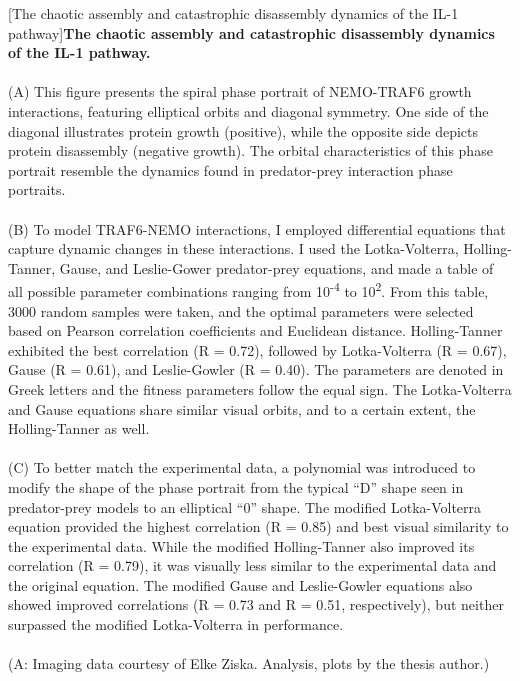 \begin{centering}
\captionsetup{parbox=none}
[The chaotic assembly and catastrophic disassembly dynamics of the IL-1 pathway]{\textbf{The chaotic assembly and catastrophic disassembly dynamics of the IL-1 pathway.}
\\
\\
(A) This figure presents the spiral phase portrait of NEMO-TRAF6 growth interactions, featuring elliptical orbits and diagonal symmetry. One side of the diagonal illustrates protein growth (positive), while the opposite side depicts protein disassembly (negative growth). The orbital characteristics of this phase portrait resemble the dynamics found in predator-prey interaction phase portraits.
\\
\\
(B) To model TRAF6-NEMO interactions, I employed differential equations that capture dynamic changes in these interactions. I used the Lotka-Volterra, Holling-Tanner, Gause, and Leslie-Gower predator-prey equations, and made a table of all possible parameter combinations ranging from 10\textsuperscript{-4} to 10\textsuperscript{2}. From this table, 3000 random samples were taken, and the optimal parameters were selected based on Pearson correlation coefficients and Euclidean distance. Holling-Tanner exhibited the best correlation (R = 0.72), followed by Lotka-Volterra (R = 0.67), Gause (R = 0.61), and Leslie-Gowler (R = 0.40). The parameters are denoted in Greek letters and the fitness parameters follow the equal sign. The Lotka-Volterra and Gause equations share similar visual orbits, and to a certain extent, the Holling-Tanner as well.
\\
\\
(C) To better match the experimental data, a polynomial was introduced to modify the shape of the phase portrait from the typical “D” shape seen in predator-prey models to an elliptical “0” shape. The modified Lotka-Volterra equation provided the highest correlation (R = 0.85) and best visual similarity to the experimental data. While the modified Holling-Tanner also improved its correlation (R = 0.79), it was visually less similar to the experimental data and the original equation. The modified Gause and Leslie-Gowler equations also showed improved correlations (R = 0.73 and R = 0.51, respectively), but neither surpassed the modified Lotka-Volterra in performance.
\\
\\
(A: Imaging data courtesy of Elke Ziska. Analysis, plots by the thesis author.)}
\label{p2:S6}
\end{centering}

